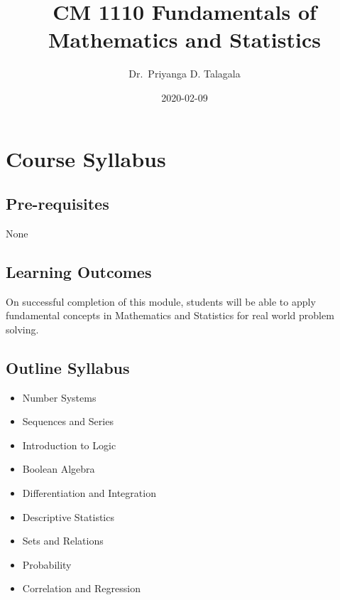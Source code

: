 \documentclass[]{book}
\title{CM 1110 Fundamentals of Mathematics and Statistics}
\author{Dr.~Priyanga D. Talagala}
\date{2020-02-09}
\providecommand{\tightlist}{%
  \setlength{\itemsep}{0pt}\setlength{\parskip}{0pt}}
\begin{document}
\maketitle

{
\setcounter{tocdepth}{1}
\tableofcontents
}
\hypertarget{course-syllabus}{%
\chapter*{Course Syllabus}\label{course-syllabus}}

\hypertarget{pre-requisites}{%
\section*{Pre-requisites}\label{pre-requisites}}

None

\hypertarget{learning-outcomes}{%
\section*{Learning Outcomes}\label{learning-outcomes}}

On successful completion of this module, students will be able to apply fundamental concepts in Mathematics and Statistics for real world problem solving.

\hypertarget{outline-syllabus}{%
\section*{Outline Syllabus}\label{outline-syllabus}}

\begin{itemize}
\tightlist
\item
  Number Systems
\item
  Sequences and Series
\item
  Introduction to Logic
\item
  Boolean Algebra
\item
  Differentiation and Integration
\item
  Descriptive Statistics
\item
  Sets and Relations
\item
  Probability
\item
  Correlation and Regression
\end{itemize}
\end{document}
